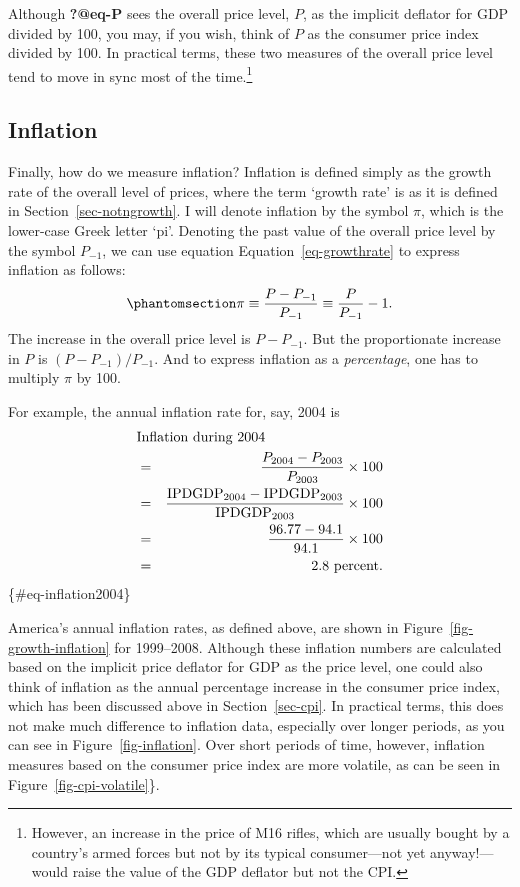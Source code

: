 \documentclass[
  letterpaper,
]{book}
\begin{document}
Although \textbf{?@eq-P} sees the overall price level, \(P\), as the
implicit deflator for GDP divided by 100, you may, if you wish, think of
\(P\) as the consumer price index divided by 100. In practical terms,
these two measures of the overall price level tend to move in sync most
of the time.\footnote{However, an increase in the price of M16 rifles,
  which are usually bought by a country's armed forces but not by its
  typical consumer---not yet anyway!---would raise the value of the GDP
  deflator but not the CPI.}

\subsection{Inflation}\label{sec-inflation}


Finally, how do we measure inflation? Inflation is defined simply as the
growth rate of the overall level of prices, where the term `growth rate'
is as it is defined in Section~\ref{sec-notngrowth}. I will denote
inflation by the symbol \(\pi\), which is the lower-case Greek letter
`pi'. Denoting the past value of the overall price level by the symbol
\(P_{-1}\), we can use equation Equation~\ref{eq-growthrate} to express
inflation as follows:
\begin{equation}\phantomsection\label{eq-inflation}{
\pi\equiv\frac{P-P_{-1}}{P_{-1}}\equiv\frac{P}{P_{-1}}-1.
}\end{equation} The increase in the overall price level is \(P-P_{-1}\).
But the proportionate increase in \(P\) is \((P-P_{-1})/P_{-1}\). And to
express inflation as a \emph{percentage}, one has to multiply \(\pi\) by
100.

For example, the annual inflation rate for, say, 2004 is
\begin{eqnarray} 
\lefteqn{\hbox{Inflation during 2004}}\nonumber \\
&=&\frac{P_{2004}-P_{2003}}{P_{2003}}\times 100\\
&=&\frac{\hbox{IPDGDP}_{2004}-\hbox{IPDGDP}_{2003}}{\hbox{IPDGDP}_{2003}}\times 100\\
&=&\frac{96.77-94.1}{94.1}\times 100\nonumber \\
&=&2.8 \hbox{ percent}.\nonumber 
\end{eqnarray}\{\#eq-inflation2004\}

America's annual inflation rates, as defined above, are shown in
Figure~\ref{fig-growth-inflation} for 1999--2008. Although these
inflation numbers are calculated based on the implicit price deflator
for GDP as the price level, one could also think of inflation as the
annual percentage increase in the consumer price index, which has been
discussed above in Section~\ref{sec-cpi}. In practical terms, this does
not make much difference to inflation data, especially over longer
periods, as you can see in Figure~\ref{fig-inflation}. Over short
periods of time, however, inflation measures based on the consumer price
index are more volatile, as can be seen in
Figure~\ref{fig-cpi-volatile}\}.
\end{document}
